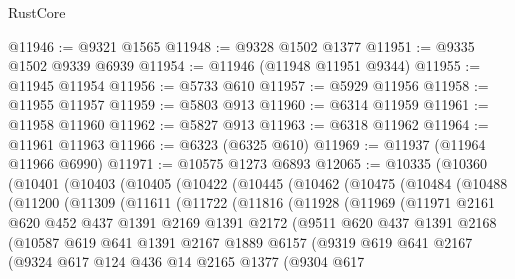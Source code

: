 \begin{lexlean}{RustCore}
\begin{coremodule}
@11946 := @9321 @1565
@11948 := @9328 @1502 @1377
@11951 := @9335 @1502 @9339 @6939
@11954 := @11946 (@11948 @11951 @9344)
@11955 := @11945 @11954
@11956 := @5733 @610
@11957 := @5929 @11956
@11958 := @11955 @11957
@11959 := @5803 @913
@11960 := @6314 @11959
@11961 := @11958 @11960
@11962 := @5827 @913
@11963 := @6318 @11962
@11964 := @11961 @11963
@11966 := @6323 (@6325 @610)
@11969 := @11937 (@11964 @11966 @6990)
@11971 := @10575 @1273 @6893
@12065 := @10335
    (@10360
      (@10401
        (@10403
          (@10405
            (@10422
              (@10445
                (@10462
                  (@10475
                    (@10484
                      (@10488
                        (@11200
                          (@11309
                            (@11611
                              (@11722
                                (@11816
                                  (@11928
                                    (@11969
                                      (@11971
                                        @2161
                                        @620
                                        @452
                                        @437
                                        @1391
                                        @2169
                                        @1391
                                        @2172
                                        (@9511
                                          @620
                                          @437
                                          @1391
                                          @2168
                                          (@10587
                                            @619
                                            @641
                                            @1391
                                            @2167
                                            @1889
                                            @6157
                                            (@9319
                                              @619
                                              @641
                                              @2167
                                              (@9324
                                                @617
                                                @124
                                                @436
                                                @14
                                                @2165
                                                @1377
                                                (@9304
                                                  @617

\end{coremodule}
\end{lexlean}
